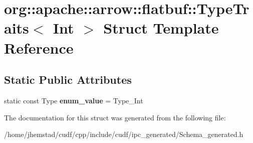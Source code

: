 \hypertarget{structorg_1_1apache_1_1arrow_1_1flatbuf_1_1TypeTraits_3_01Int_01_4}{}\section{org\+:\+:apache\+:\+:arrow\+:\+:flatbuf\+:\+:Type\+Traits$<$ Int $>$ Struct Template Reference}
\label{structorg_1_1apache_1_1arrow_1_1flatbuf_1_1TypeTraits_3_01Int_01_4}
\subsection*{Static Public Attributes}
\begin{DoxyCompactItemize}
\item 
static const Type {\bfseries enum\+\_\+value} = Type\+\_\+\+Int\hypertarget{structorg_1_1apache_1_1arrow_1_1flatbuf_1_1TypeTraits_3_01Int_01_4_ab859153b83fc57e02fc155719af3729a}{}\label{structorg_1_1apache_1_1arrow_1_1flatbuf_1_1TypeTraits_3_01Int_01_4_ab859153b83fc57e02fc155719af3729a}

\end{DoxyCompactItemize}


The documentation for this struct was generated from the following file\+:\begin{DoxyCompactItemize}
\item 
/home/jhemstad/cudf/cpp/include/cudf/ipc\+\_\+generated/Schema\+\_\+generated.\+h\end{DoxyCompactItemize}
